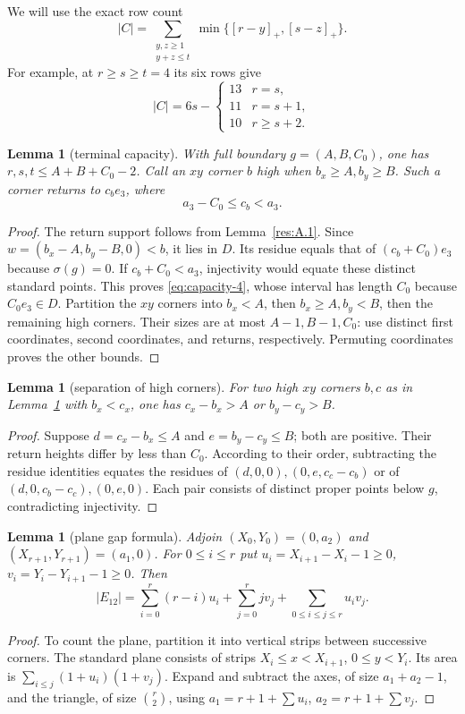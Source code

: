 \documentclass[11pt]{article}
\newtheorem{lemma}[theorem]{Lemma}
\theoremstyle{definition}
\theoremstyle{remark}
\theoremstyle{plain}
\begin{document}
We will use the exact row count
\[
 |C|=\sum_{\substack{y,z\ge1\\y+z\le t}}
 \min\{[r-y]_+,[s-z]_+\}.\tag{3.2}\label{eq:capacity-2}
\]
For example, at $r\ge s\ge t=4$ its six rows give
\[
 |C|=6s-\begin{cases}13&r=s,\\11&r=s+1,\\10&r\ge s+2.\end{cases}\tag{3.3}\label{eq:capacity-3}
\]

\begin{lemma}[terminal capacity]\label{res:A.5}
With full boundary $g=(A,B,C_0)$, one has $r,s,t\le A+B+C_0-2$.
Call an $xy$ corner $b$ \emph{high} when $b_x\ge A,b_y\ge B$.
Such a corner returns to $c_be_3$, where
\[
 a_3-C_0\le c_b<a_3.\tag{3.4}\label{eq:capacity-4}
\]
\end{lemma}
\begin{proof}
The return support follows from Lemma~\ref{res:A.1}.
Since $w=(b_x-A,b_y-B,0)<b$, it lies in $D$. Its residue equals
that of $(c_b+C_0)e_3$ because $\sigma(g)=0$. If $c_b+C_0<a_3$, injectivity would equate these
distinct standard points. This proves \eqref{eq:capacity-4}, whose interval has length
$C_0$ because $C_0e_3\in D$.
Partition the $xy$ corners into $b_x<A$, then $b_x\ge A,b_y<B$,
then the remaining high corners. Their sizes are at most $A-1,B-1,C_0$:
use distinct first coordinates, second coordinates, and returns,
respectively. Permuting coordinates proves the other bounds.
\end{proof}

\begin{lemma}[separation of high corners]\label{res:A.6}
For two high $xy$ corners $b,c$ as in Lemma~\ref{res:A.5} with $b_x<c_x$,
one has $c_x-b_x>A$ or $b_y-c_y>B$.
\end{lemma}
\begin{proof}
Suppose $d=c_x-b_x\le A$ and $e=b_y-c_y\le B$; both are positive.
Their return heights differ by less than $C_0$. According to their
order, subtracting the residue identities equates the residues of
$(d,0,0),(0,e,c_c-c_b)$ or of $(d,0,c_b-c_c),(0,e,0)$.
Each pair consists of distinct proper points below $g$, contradicting
injectivity. \end{proof}

\begin{lemma}[plane gap formula]\label{res:A.7}
Adjoin $(X_0,Y_0)=(0,a_2)$ and $(X_{r+1},Y_{r+1})=(a_1,0)$.
For $0\le i\le r$ put
$u_i=X_{i+1}-X_i-1\ge0$, $v_i=Y_i-Y_{i+1}-1\ge0$. Then
\[
 |E_{12}|=\sum_{i=0}^r(r-i)u_i+\sum_{j=0}^r jv_j
             +\sum_{0\le i\le j\le r}u_iv_j.\tag{3.5}\label{eq:capacity-5}
\]
\end{lemma}
\begin{proof}
To count the plane, partition it into vertical strips between successive
corners. The standard plane consists of strips $X_i\le x<X_{i+1}$,
$0\le y<Y_i$. Its area is
$\sum_{i\le j}(1+u_i)(1+v_j)$.
Expand and subtract the axes, of size $a_1+a_2-1$, and the triangle,
of size $\binom r2$, using
$a_1=r+1+\sum u_i$, $a_2=r+1+\sum v_j$. \end{proof}
\end{document}
